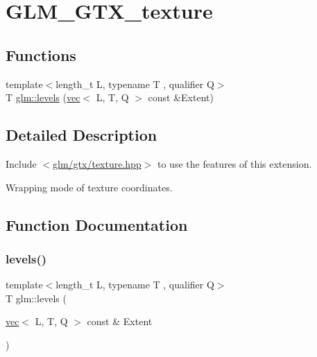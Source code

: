 \hypertarget{group__gtx__texture}{}\section{G\+L\+M\+\_\+\+G\+T\+X\+\_\+texture}
\label{group__gtx__texture}
\subsection*{Functions}
\begin{DoxyCompactItemize}
\item 
{\footnotesize template$<$length\+\_\+t L, typename T , qualifier Q$>$ }\\T \mbox{\hyperlink{group__gtx__texture_gaa8c377f4e63486db4fa872d77880da73}{glm\+::levels}} (\mbox{\hyperlink{structglm_1_1vec}{vec}}$<$ L, T, Q $>$ const \&Extent)
\end{DoxyCompactItemize}


\subsection{Detailed Description}
Include $<$\mbox{\hyperlink{texture_8hpp}{glm/gtx/texture.\+hpp}}$>$ to use the features of this extension.

Wrapping mode of texture coordinates. 

\subsection{Function Documentation}
\mbox{\label{group__gtx__texture_gaa8c377f4e63486db4fa872d77880da73}} 
\subsubsection{\texorpdfstring{levels()}{levels()}}
{\footnotesize\ttfamily template$<$length\+\_\+t L, typename T , qualifier Q$>$ \\
T glm\+::levels (\begin{DoxyParamCaption}\item[{\mbox{\hyperlink{structglm_1_1vec}{vec}}$<$ L, T, Q $>$ const \&}]{Extent }\end{DoxyParamCaption})\hspace{0.3cm}{\ttfamily [inline]}}


